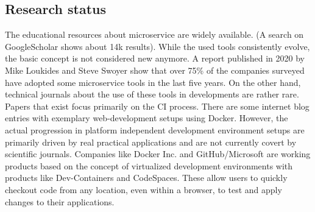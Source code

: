 \documentclass[12pt, a4paper]{article}
\begin{document}
\subsection{Research status}
The educational resources about microservice are widely available. (A search on GoogleScholar shows about 14k results). While the used tools consistently evolve, the basic concept is not considered new anymore. A report published in 2020 by Mike Loukides and Steve Swoyer show that over 75\% of the companies surveyed have adopted some microservice tools in the last five years.\cite{msadoption}
On the other hand, technical journals about the use of these tools in developments are rather rare. Papers that exist focus primarily on the \acl*{CI} process. There are some internet blog entries with exemplary web-development setups using Docker. However, the actual progression in platform independent development environment setups are primarily driven by real practical applications and are not currently covert by scientific journals. Companies like Docker Inc. and GitHub/Microsoft are working products based on the concept of virtualized development environments with products like Dev-Containers and CodeSpaces. These allow users to quickly checkout code from any location, even within a browser, to test and apply changes to their applications.
\end{document}
